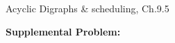 \documentclass[handout]{mcs}
\begin{document}

\begin{staffnotes}
Acyclic Digraphs \& scheduling, Ch.9.5
\end{staffnotes}



\textbf{Supplemental Problem:}



\end{document}
